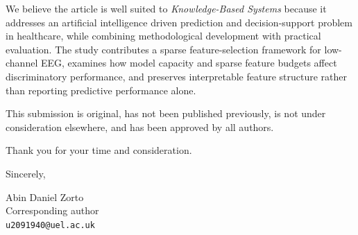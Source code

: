 \documentclass[11pt]{article}
\begin{document}
We believe the article is well suited to \emph{Knowledge-Based Systems} because it addresses an artificial intelligence driven prediction and decision-support problem in healthcare, while combining methodological development with practical evaluation. The study contributes a sparse feature-selection framework for low-channel EEG, examines how model capacity and sparse feature budgets affect discriminatory performance, and preserves interpretable feature structure rather than reporting predictive performance alone.

This submission is original, has not been published previously, is not under consideration elsewhere, and has been approved by all authors.

Thank you for your time and consideration.

Sincerely,

\vspace{1.2em}

Abin Daniel Zorto\\
Corresponding author\\
\texttt{u2091940@uel.ac.uk}
\end{document}

